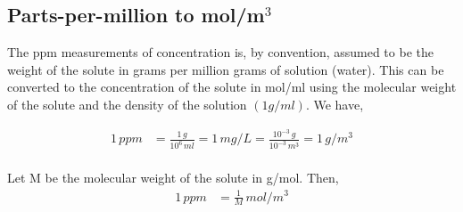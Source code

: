 \subsection{Parts-per-million to mol/m$^3$}

The ppm measurements of concentration is, by convention, assumed to be the
weight of the solute in grams per million grams of solution (water). This can be
converted to the concentration of the solute in mol/ml using the molecular
weight of the solute and the density of the solution $(1 g/ml)$. We have,

\begin{align*}
    1 \, ppm &= \frac{1 \, g}{10^6 \, ml} = 1 \, mg/L = \frac{10^{-3} \, g}{10^{-3} \, m^3} = 1 \, g/m^3\\
\end{align*}

Let M be the molecular weight of the solute in g/mol. Then,
\begin{align}
    1 \, ppm &= \frac{1}{M} \, mol/m^3
\end{align}
